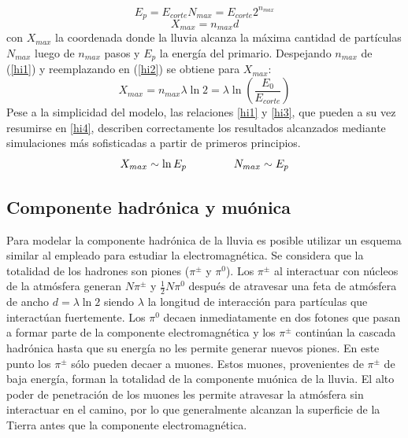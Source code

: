 %
\begin{equation}
\label{hi1}
E_p = E_{corte} N_{max} = E_{corte} 2^{n_{max}}
\end{equation}
%
\begin{equation}
\label{hi2}
X_{max}=n_{max} d
\end{equation}
%
con $X_{max}$ la coordenada donde la lluvia alcanza la máxima cantidad de partículas $N_{max}$ luego de $n_{max}$ pasos y $E_p$ la energía del primario.
Despejando $n_{max}$ de (\ref{hi1}) y reemplazando en (\ref{hi2}) se obtiene para $X_{max}$:
%
\begin{equation}
\label{hi3}
X_{max} = n_{max} \lambda \ln2=\lambda \ln\left(\frac{E_{0}}{E_{corte}}\right)
\end{equation}
%
Pese a la simplicidad del modelo, las relaciones \ref{hi1} y \ref{hi3}, que pueden a su vez resumirse en \ref{hi4}, describen correctamente los resultados alcanzados mediante simulaciones más sofisticadas a partir de primeros principios.
%
\begin{equation}
\label{hi4}
X_{max} \sim \ln E_{p}
\hspace*{15mm}
N_{max} \sim E_p
\end{equation}
%

\subsection{Componente hadrónica y muónica}

Para modelar la componente hadrónica de la lluvia es posible utilizar un esquema similar al empleado para estudiar la electromagnética.
Se considera que la totalidad de los hadrones son piones ($\pi^{\pm}$ y $\pi^{0}$). Los $\pi^{\pm}$ al interactuar con n\'ucleos de la atm\'osfera generan $N \pi^{\pm}$ y $\frac{1}{2}N \pi^{0}$ después de atravesar una feta de atmósfera de ancho $d=\lambda \ln2$ siendo $\lambda$ la longitud de interacción para partículas que interactúan fuertemente.
Los $\pi^{0}$ decaen inmediatamente en dos fotones que pasan a formar parte de la componente electromagnética y los $\pi^{\pm}$ continúan la cascada hadrónica hasta que su energía no les permite generar nuevos piones.
En este punto los $\pi^{\pm}$ s\'olo pueden decaer a muones.
Estos muones, provenientes de $\pi^{\pm}$ de baja energía, forman la totalidad de la componente muónica de la lluvia.
El alto poder de penetración de los muones les permite atravesar la atmósfera sin interactuar en el camino, por lo que generalmente alcanzan la superficie de la Tierra antes que la componente electromagnética.

